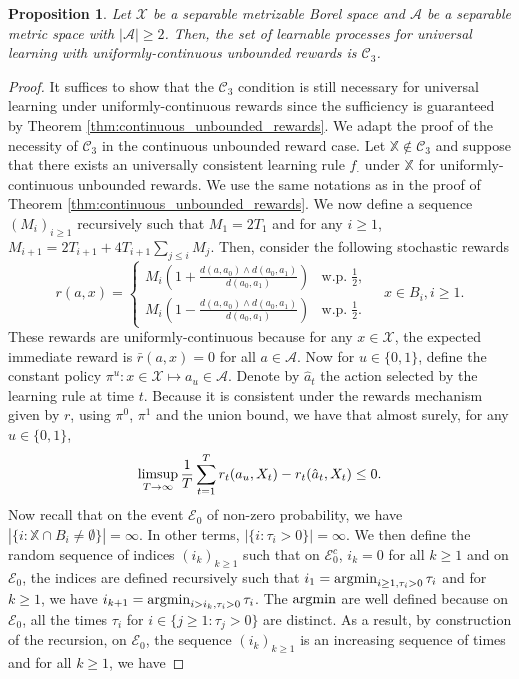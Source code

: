 \documentclass[aos]{imsart}
\theoremstyle{plain}
\newtheorem{proposition}[theorem]{Proposition}
\theoremstyle{remark}
\newcommand{\Acal}{\mathcal{A}}
\newcommand{\Ccal}{\mathcal{C}}
\newcommand{\Ecal}{\mathcal{E}}
\newcommand{\Xcal}{\mathcal{X}}
\newcommand{\Xbb}{\mathbb{X}}
\newcommand{\1}{\mathbbm{1}}%
\newcommand{\argmin}{\mathop{\rm argmin}}
\renewcommand{\limsup}{\mathop{\rm limsup}}
\begin{document}
\begin{proposition}\label{prop:uniformly_continuous_unbounded}
Let $\Xcal$ be a separable metrizable Borel space and $\Acal$ be a separable metric space with $|\Acal|\geq 2$. Then, the set of learnable processes for universal learning with uniformly-continuous unbounded rewards is $\Ccal_3$.
\end{proposition}
\begin{proof}
It suffices to show that the $\Ccal_3$ condition is still necessary for universal learning under uniformly-continuous rewards since the sufficiency is guaranteed by Theorem \ref{thm:continuous_unbounded_rewards}. We adapt the proof of the necessity of $\Ccal_3$ in the continuous unbounded reward case. Let $\Xbb\notin\Ccal_3$ and suppose that there exists an universally consistent learning rule $f_\cdot$ under $\Xbb$ for uniformly-continuous unbounded rewards. We use the same notations as in the proof of Theorem \ref{thm:continuous_unbounded_rewards}. We now define a sequence $(M_i)_{i\geq 1}$ recursively such that $M_1 = 2T_1$ and for any $i\geq 1$, $M_{i+1} = 2T_{i+1} + 4T_{i+1} \sum_{j\leq i} M_j$. Then, consider the following stochastic rewards
\begin{equation*}
    r(a, x) = \begin{cases}
        M_i\left(1+  \frac{d(a,a_0)\wedge d(a_0,a_1)}{d(a_0,a_1)}\right)  &\text{w.p.}\; \frac{1}{2},\\
        M_i\left(1- \frac{d(a,a_0)\wedge d(a_0,a_1)}{d(a_0,a_1)}\right) &\text{w.p.}\; \frac{1}{2}.
    \end{cases}\quad x\in B_i,i\geq 1.
\end{equation*}
These rewards are uniformly-continuous because for any $x\in \Xcal$, the expected immediate reward is $\bar r(a, x) = 0$ for all $a\in\Acal$. Now for $u\in\{0,1\}$, define the constant policy $\pi^u:x\in\Xcal\mapsto a_u\in\Acal$. Denote by $\hat a_t$ the action selected by the learning rule at time $t$. Because it is consistent under the rewards mechanism given by $r$, using $\pi^0$, $\pi^1$ and the union bound, we have that almost surely, for any $u\in\{0,1\}$,
\begin{equation}\label{eq:two_almost_sure_events}
    \limsup_{T\to\infty} \frac{1}{T}\sum_{t=1}^T r_t(a_u, X_t) - r_t(\hat a_t, X_t) \leq 0.
\end{equation}
Now recall that on the event $\Ecal_0$ of non-zero probability, we have $|\{i:\Xbb\cap B_i\neq\emptyset\}|=\infty$. In other terms, $|\{i:\tau_i>0\}|=\infty$. We then define the random sequence of indices $(i_k)_{k\geq 1}$ such that on $\Ecal_0^c$, $i_k=0$ for all $k\geq 1$ and on $\Ecal_0$, the indices are defined recursively such that $i_1 = \argmin_{i\geq 1, \tau_i>0} \tau_i$ and for $k\geq 1$, we have $i_{k+1} = \argmin_{i>i_k, \tau_i>0} \tau_i$. The $\argmin$ are well defined because on $\Ecal_0$, all the times $\tau_i$ for $i\in\{j\geq 1:\tau_j>0\}$ are distinct. As a result, by construction of the recursion, on $\Ecal_0$, the sequence $(i_k)_{k\geq 1}$ is an increasing sequence of times and for all $k\geq 1$, we have

\end{proof}
\end{document}

